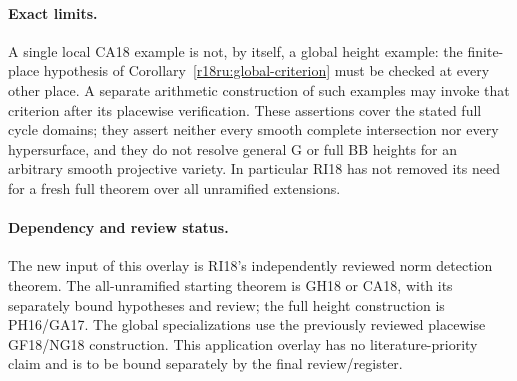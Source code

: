 \paragraph{Exact limits.}
A single local CA18 example is not, by itself, a global height
example: the finite-place hypothesis of
Corollary~\ref{r18ru:global-criterion} must be checked at every
other place.  A separate arithmetic construction of such examples
may invoke that criterion after its placewise verification.
These assertions cover the stated full cycle domains; they assert
neither every smooth complete intersection nor every hypersurface,
and they do not resolve general G or full BB heights for an arbitrary
smooth projective variety.  In particular RI18 has not removed its
need for a fresh full theorem over all unramified extensions.

\paragraph{Dependency and review status.}
The new input of this overlay is RI18's independently reviewed norm
detection theorem.  The all-unramified starting theorem is GH18 or
CA18, with its separately bound hypotheses and review; the full
height construction is PH16/GA17.  The global specializations use
the previously reviewed placewise GF18/NG18 construction.  This
application overlay has no literature-priority claim and is to be
bound separately by the final review/register.

